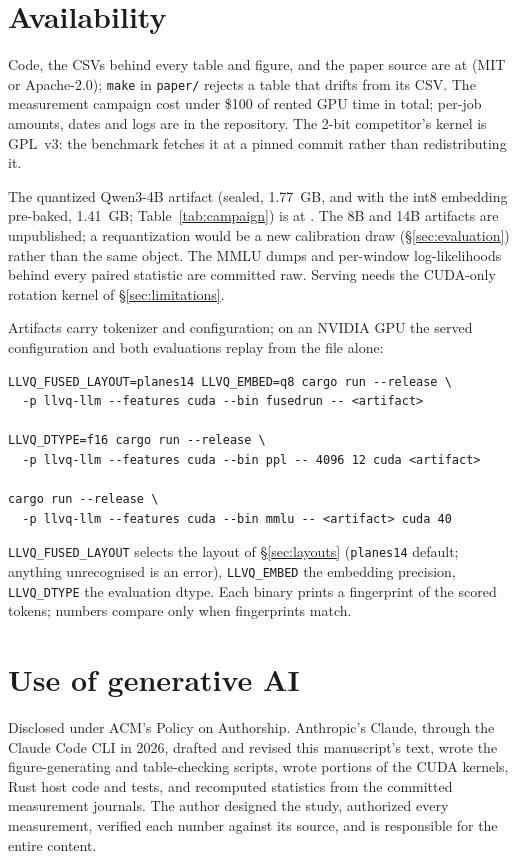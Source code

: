 \section{Availability}
\label{sec:availability}

Code, the CSVs behind every table and figure, and the paper source are at
 (MIT or Apache-2.0);
\texttt{make} in \texttt{paper/} rejects a table that drifts from its CSV.
The measurement campaign cost under \$100 of rented GPU time in total;
per-job amounts, dates and logs are in the repository. The 2-bit
competitor's kernel is GPL~v3: the benchmark fetches it at a pinned commit
rather than redistributing it.

The quantized Qwen3-4B artifact (sealed, 1.77~GB, and with the int8 embedding
pre-baked, 1.41~GB; Table~\ref{tab:campaign}) is at
. The 8B
and 14B artifacts are unpublished; a requantization would be a new
calibration draw (\S\ref{sec:evaluation}) rather than the same object. The
MMLU dumps and per-window log-likelihoods behind every paired statistic are
committed raw. Serving needs the CUDA-only rotation kernel of
\S\ref{sec:limitations}.

Artifacts carry tokenizer and configuration; on an NVIDIA GPU the served
configuration and both evaluations replay from the file alone:

{\small
\begin{verbatim}
LLVQ_FUSED_LAYOUT=planes14 LLVQ_EMBED=q8 cargo run --release \
  -p llvq-llm --features cuda --bin fusedrun -- <artifact>

LLVQ_DTYPE=f16 cargo run --release \
  -p llvq-llm --features cuda --bin ppl -- 4096 12 cuda <artifact>

cargo run --release \
  -p llvq-llm --features cuda --bin mmlu -- <artifact> cuda 40
\end{verbatim}
}

\noindent
\texttt{LLVQ\_FUSED\_LAYOUT} selects the layout of \S\ref{sec:layouts}
(\texttt{planes14} default; anything unrecognised is an error),
\texttt{LLVQ\_EMBED} the embedding precision, \texttt{LLVQ\_DTYPE} the
evaluation dtype. Each binary prints a fingerprint of the scored tokens;
numbers compare only when fingerprints match.

\section*{Use of generative AI}

Disclosed under ACM's Policy on Authorship. Anthropic's Claude, through the
Claude Code CLI in 2026, drafted and revised this manuscript's text, wrote
the figure-generating and table-checking scripts, wrote portions of the CUDA
kernels, Rust host code and tests, and recomputed statistics from the
committed measurement journals. The author designed the study, authorized
every measurement, verified each number against its source, and is
responsible for the entire content.
